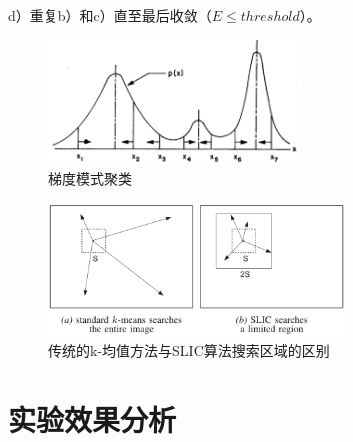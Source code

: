 \documentclass[12pt]{article}
\begin{document}
d）重复b）和c）直至最后收敛（$E\le threshold$）。

\begin{figure}[!ht]
\centering
\includegraphics[width=0.6\textwidth]{1.png}
\caption{梯度模式聚类}
\label{fig:1}
\end{figure} 

\begin{figure}[!ht]
\centering
\includegraphics[width=0.7\textwidth]{2.png}
\caption{传统的k-均值方法与SLIC算法搜索区域的区别}
\label{fig:2}
\end{figure} 

\section{实验效果分析}







\end{document}
